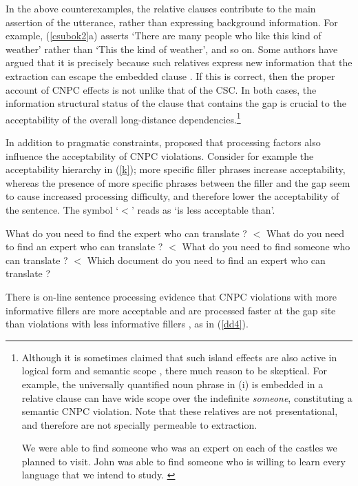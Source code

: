 \documentclass[output=paper
                ,modfonts
                ,nonflat
	        ,collection
	        ,collectionchapter
	        ,collectiontoclongg
 	        ,biblatex
                ,babelshorthands
                ,newtxmath
                ,draftmode
                ,colorlinks, citecolor=brown
]{./langsci/langscibook}
\begin{document}
In the above counterexamples, the relative clauses contribute to the main assertion of the utterance, rather than expressing background information. For example, (\ref{csubok2}a) asserts `There are many people who like this kind of weather' rather than `This the kind of weather', and so on.
Some authors have argued that it is precisely because such relatives
express new information that the extraction can escape the embedded clause
  \citep{shirlappin,kuno87,Dean,goldberg13}.  If this is correct, then the proper 
  account of CNPC effects is not unlike that of the CSC. In both cases, 
  the information structural status of the clause that contains the gap is crucial
  to the acceptability of the overall long-distance dependencies.\footnote{Although it is sometimes claimed
   that
such  island effects are also active in logical form and semantic scope \citep{may85,ruys,fox,sab,katzira}, 
  there much reason to be skeptical.  For example, the universally quantified noun phrase  in (i)  is embedded in a relative clause can have wide scope over the indefinite \emph{someone}, constituting a semantic CNPC violation. Note that these relatives are not presentational, and therefore are not specially permeable to extraction.

\eal
\ex  We were able to find someone who was an expert on each of the
     castles we planned to visit.  \citep[304]{MRS}
\ex John was able to find someone  who is willing to learn every  language
    that we intend to study. \citep{chavesrnr}
\zllast}

 
 
  
In addition to pragmatic constraints,  \citet{kluender92,kluender}  proposed that 
processing factors also  influence the acceptability of    CNPC violations.
Consider for example the acceptability hierarchy in  (\ref{k});  more specific filler phrases increase acceptability, whereas    the presence of more specific phrases between the filler and the gap seem  to cause increased processing difficulty, and therefore   lower the acceptability of the sentence.  The symbol `$<$' reads as `is less acceptable than'.

\eal \label{k}
\ex What do you need to find the expert who can translate \spc?  $<$
\ex What do you need to find an expert who can translate \spc?   $<$
\ex What do you need to find someone who can translate \spc? $<$
\ex Which document do you need to find an expert who can translate \spc?
\zl


\indent
There is on-line sentence processing evidence that   CNPC   violations  with more informative  fillers are more acceptable and are processed faster at the gap site than violations with less informative fillers \citep{hofsaglang}, as in  (\ref{dd4}).
 
\end{document}
